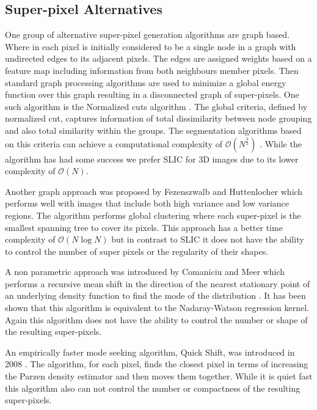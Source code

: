 \subsection{Super-pixel Alternatives}
One group of alternative super-pixel generation algorithms are graph based. Where in each pixel is initially considered to be a single node in a graph with undirected edges to its adjacent pixels. The edges are assigned weights based on a feature map including information from both neighbours member pixels. Then standard graph processing algorithms are used to minimize a global energy function over this graph resulting in a disconnected graph of super-pixels. 
One such algorithm is the Normalized cuts algorithm \cite{shi2000normalized}. The global criteria, defined by normalized cut, captures information of total dissimilarity between node grouping and also total similarity within the groups. The segmentation algorithms based on this criteria can achieve a computational complexity of $\mathcal{O}(N^{\frac{3}{2}})$ \cite{levinshtein2009turbopixels}. While the algorithm has had some success \cite{mori2005guiding} we prefer SLIC for 3D images due to its lower complexity of $\mathcal{O}(N)$. 
\par
Another graph approach was proposed by Fezenszwalb and Huttenlocher \cite{felzenszwalb2004efficient} which performs well with images that include both high variance and low variance regions. The algorithm performs global clustering where each super-pixel is the smallest spanning tree to cover its pixels. This approach has a better time complexity of $\mathcal{O}(N\log N)$ but in contrast to SLIC it does not have the ability to control the number of super pixels or the regularity of their shapes. 
\par 
A non parametric approach was introduced by Comaniciu and Meer which performs a recursive mean shift in the direction of the nearest stationary point of an underlying density function to find the mode of the distribution \cite{comaniciu2002mean}. It has been shown that this algorithm is equivalent to the Nadaray-Watson regression kernel. Again this algorithm does not have the ability to control the number or shape of the resulting super-pixels. 
\par
An empirically faster mode seeking algorithm, Quick Shift, was introduced in 2008 \cite{vedaldi2008quick}. The algorithm, for each pixel, finds the closest pixel in terms of increasing the Parzen density estimator and then moves them together. While it is quiet fast this algorithm also can not control the number or compactness of the resulting super-pixels. 

